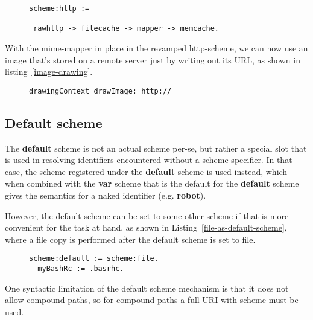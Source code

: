 \documentclass[preprint,authoryear]{acm_proc_article-sp}
\begin{document}
\begin{figure}[htbp]
\begin{lstlisting}[style=L,label=http-converted-cached-listing,caption=Converting and caching.]
scheme:http := 

 rawhttp -> filecache -> mapper -> memcache.
\end{lstlisting}
\end{figure}

With the mime-mapper in place in the revamped http-scheme, we can now use 
an image that's stored on a remote server just by writing out its URL, as shown
in listing~\ref{image-drawing}.

\begin{figure}[htbp]
\begin{lstlisting}[style=L,label=image-drawing,caption=Drawing a remote image.]
drawingContext drawImage: http://
\end{lstlisting}
\end{figure}



\subsection{Default scheme}


The {\bf default} scheme is not an actual scheme per-se, but rather a special slot
that is used in resolving identifiers encountered without a scheme-specifier.
In that case, the scheme registered under the {\bf default} scheme is used
instead, which when combined with the {\bf var} scheme that is the default
for the {\bf default} scheme gives the semantics for a naked identifier (e.g. {\bf robot}).

However, the default scheme can be set to some other scheme if that is more
convenient for the task at hand, as shown in Listing~\ref{file-as-default-scheme},
where a file copy is performed after the default scheme is set to file.


\begin{figure}[htbp]
\begin{lstlisting}[style=L,label=file-as-default-scheme,caption=File copy with file: as default scheme.]
  scheme:default := scheme:file.
  myBashRc := .basrhc.
\end{lstlisting}
\end{figure}

One syntactic limitation of the default scheme mechanism is that it does not allow
compound paths, so for compound paths a full URI with scheme must be used.
\end{document}
